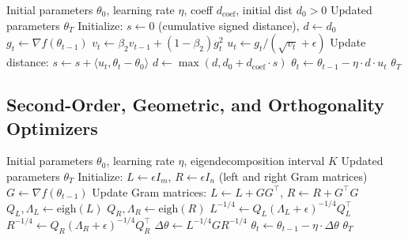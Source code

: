 \begin{algorithm}[H]
\caption{Prodigy (Approximating the Distance Estimate)}
\label{alg:prodigy}
\begin{algorithmic}[1]
\Require Initial parameters $\theta_0$, learning rate $\eta$, coeff $d_{\text{coef}}$, initial dist $d_0 > 0$
\Ensure Updated parameters $\theta_T$
\State Initialize: $s \gets 0$ (cumulative signed distance), $d \gets d_0$
    \State $g_t \gets \nabla f(\theta_{t-1})$
    \State $v_t \gets \beta_2 v_{t-1} + (1-\beta_2) g_t^2$ 
    \State $u_t \gets g_t / (\sqrt{v_t} + \epsilon)$ 
    \State Update distance: $s \gets s + \langle u_t, \theta_t - \theta_0 \rangle$ 
    \State $d \gets \max(d, d_0 + d_{\text{coef}} \cdot s)$ 
    \State $\theta_t \gets \theta_{t-1} - \eta \cdot d \cdot u_t$ 
\EndFor
\Return $\theta_T$
\end{algorithmic}
\end{algorithm}

\subsection{Second-Order, Geometric, and Orthogonality Optimizers}

\begin{algorithm}[H]
\caption{Shampoo (Matrix Preconditioning via Kronecker Products)}
\label{alg:shampoo}
\begin{algorithmic}[1]
\Require Initial parameters $\theta_0$, learning rate $\eta$, eigendecomposition interval $K$
\Ensure Updated parameters $\theta_T$
\State Initialize: $L \gets \epsilon I_m$, $R \gets \epsilon I_n$ (left and right Gram matrices)
    \State $G \gets \nabla f(\theta_{t-1})$ 
    \State Update Gram matrices: $L \gets L + G G^\top$, $R \gets R + G^\top G$
        \State $Q_L, \Lambda_L \gets \text{eigh}(L)$ 
        \State $Q_R, \Lambda_R \gets \text{eigh}(R)$ 
        \State $L^{-1/4} \gets Q_L (\Lambda_L + \epsilon)^{-1/4} Q_L^\top$
        \State $R^{-1/4} \gets Q_R (\Lambda_R + \epsilon)^{-1/4} Q_R^\top$
    \EndIf
    \State $\Delta \theta \gets L^{-1/4} G R^{-1/4}$ 
    \State $\theta_t \gets \theta_{t-1} - \eta \cdot \Delta \theta$
\EndFor
\Return $\theta_T$
\end{algorithmic}
\end{algorithm}

